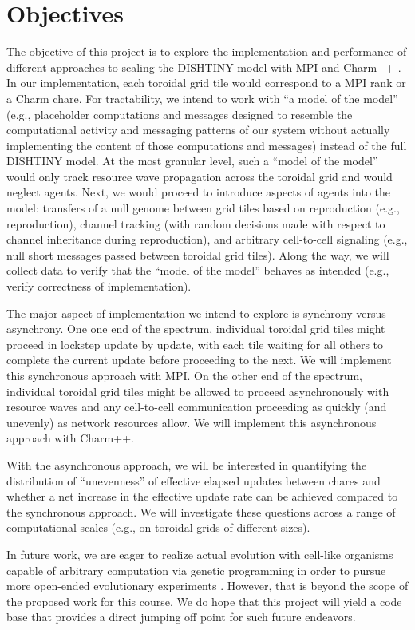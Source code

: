 \section{Objectives}

The objective of this project is to explore the implementation and performance of different approaches to scaling the DISHTINY model with MPI and Charm++ \cite{kale1993charm, Forum:1994:MMI:898758}.
In our implementation, each toroidal grid tile would correspond to a MPI rank or a Charm chare.
For tractability, we intend to work with ``a model of the model'' (e.g., placeholder computations and messages designed to resemble the computational activity and messaging patterns of our system without actually implementing the content of those computations and messages) instead of the full DISHTINY model.
At the most granular level, such a ``model of the model'' would only track resource wave propagation across the toroidal grid and would neglect agents.
Next, we would proceed to introduce aspects of agents into the model: transfers of a null genome between grid tiles based on reproduction (e.g., reproduction), channel tracking (with random decisions made with respect to channel inheritance during reproduction), and arbitrary cell-to-cell signaling (e.g., null short messages passed between toroidal grid tiles).
Along the way, we will collect data to verify that the ``model of the model'' behaves as intended (e.g., verify correctness of implementation).

The major aspect of implementation we intend to explore is synchrony versus asynchrony.
One one end of the spectrum, individual toroidal grid tiles might proceed in lockstep update by update, with each tile waiting for all others to complete the current update before proceeding to the next.
We will implement this synchronous approach with MPI.
On the other end of the spectrum, individual toroidal grid tiles might be allowed to proceed asynchronously with resource waves and any cell-to-cell communication proceeding as quickly (and unevenly) as network resources allow.
We will implement this asynchronous approach with Charm++.

With the asynchronous approach, we will be interested in quantifying the distribution of ``unevenness'' of effective elapsed updates between chares and whether a net increase in the effective update rate can be achieved compared to the synchronous approach.
We will investigate these questions across a range of computational scales (e.g., on toroidal grids of different sizes).

In future work, we are eager to realize actual evolution with cell-like organisms capable of arbitrary computation via genetic programming in order to pursue more open-ended evolutionary experiments \cite{lalejini2018evolving}.
However, that is beyond the scope of the proposed work for this course.
We do hope that this project will yield a code base that provides a direct jumping off point for such future endeavors.
